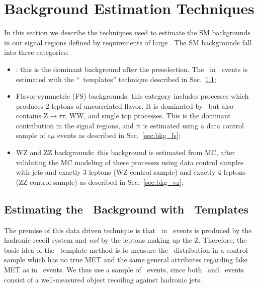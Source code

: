 \section{Background Estimation Techniques}
\label{sec:bkg}

In this section we describe the techniques used to estimate the SM backgrounds in our signal regions defined by requirements of large \MET.
The SM backgrounds fall into three categories:

\begin{itemize}
\item \zjets: this is the dominant background after the preselection. The \MET\ in \zjets\ events is estimated with the 
``\MET\ templates'' technique described in Sec.~\ref{sec:bkg_zjets};
\item Flavor-symmetric (FS) backgrounds: this category includes processes which produces 2 leptons of uncorrelated flavor. It is dominated
by \ttbar\ but also contains Z$\to\tau\tau$, WW, and single top processes. This is the dominant contribution in the signal regions, and it
is estimated using a data control sample of e$\mu$ events as described in Sec.~\ref{sec:bkg_fs};
\item WZ and ZZ backgrounds: this background is estimated from MC, after validating the MC modeling of these processes using data control
samples with jets and exactly 3 leptons (WZ control sample) and exactly 4 leptons (ZZ control sample) as described in Sec.~\ref{sec:bkg_vz};
\end{itemize}

\subsection{Estimating the \zjets\ Background with \MET\ Templates}
\label{sec:bkg_zjets}

The premise of this data driven technique is that \MET\ in \zjets\ events
is produced by the hadronic recoil system and {\it not} by the leptons making up the Z.
Therefore, the basic idea of the \MET\ template method is to measure the \MET\ distribution in 
a control sample which has no true MET and the same general attributes regarding
fake MET as in \zjets\ events. We thus use a sample of \gjets\ events, since both \zjets\
and \gjets\ events consist of a well-measured object recoiling against hadronic jets.

